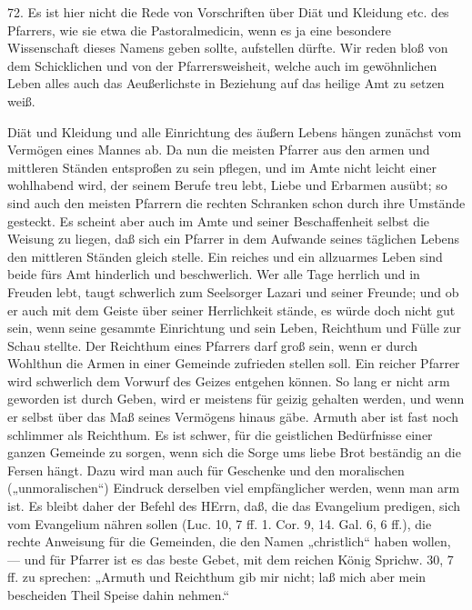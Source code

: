 72. Es ist hier nicht die Rede von Vorschriften über Diät und Kleidung etc. des Pfarrers, wie sie etwa die Pastoralmedicin, wenn es ja eine besondere Wissenschaft dieses Namens geben sollte, aufstellen dürfte. Wir reden bloß von dem Schicklichen und von der Pfarrersweisheit, welche auch im gewöhnlichen Leben alles auch das Aeußerlichste in Beziehung auf das heilige Amt zu setzen weiß.

Diät und Kleidung und alle Einrichtung des äußern Lebens hängen zunächst vom Vermögen eines Mannes ab. Da nun die meisten Pfarrer aus den armen und mittleren Ständen entsproßen zu sein pflegen, und im Amte nicht leicht einer wohlhabend wird, der seinem Berufe treu lebt, Liebe und Erbarmen ausübt; so sind auch den meisten Pfarrern die rechten Schranken schon durch ihre Umstände gesteckt. Es scheint aber auch im Amte und seiner Beschaffenheit selbst die Weisung zu liegen, daß sich ein Pfarrer in dem Aufwande seines täglichen Lebens den mittleren Ständen gleich stelle. Ein reiches und ein allzuarmes Leben sind beide fürs Amt hinderlich und beschwerlich. Wer alle Tage herrlich und in Freuden lebt, taugt schwerlich zum Seelsorger Lazari und seiner Freunde; und ob er auch mit dem Geiste über seiner Herrlichkeit stände, es würde doch nicht gut sein, wenn seine gesammte Einrichtung und
sein Leben, Reichthum und Fülle zur Schau stellte. Der Reichthum eines Pfarrers darf groß sein, wenn er durch Wohlthun die Armen in einer Gemeinde zufrieden stellen soll. Ein reicher Pfarrer wird schwerlich dem Vorwurf des Geizes entgehen können. So lang er nicht arm geworden ist durch Geben, wird er meistens für geizig gehalten werden, und wenn er selbst über das Maß seines Vermögens hinaus gäbe. Armuth aber ist fast noch schlimmer als Reichthum. Es ist schwer, für die geistlichen Bedürfnisse einer ganzen Gemeinde zu sorgen, wenn sich die Sorge ums liebe Brot beständig an die Fersen hängt. Dazu wird man auch für Geschenke und den moralischen („unmoralischen“) Eindruck derselben viel empfänglicher werden, wenn man arm ist. Es bleibt daher der Befehl des HErrn, daß, die das Evangelium predigen, sich vom Evangelium nähren sollen (Luc. 10, 7 ff. 1. Cor. 9, 14. Gal. 6, 6 ff.), die rechte Anweisung für die Gemeinden, die den Namen „christlich“ haben wollen, — und für Pfarrer ist es das beste Gebet, mit dem reichen König Sprichw. 30, 7 ff. zu sprechen: „Armuth und Reichthum gib mir nicht; laß mich aber mein bescheiden Theil Speise dahin nehmen.“

